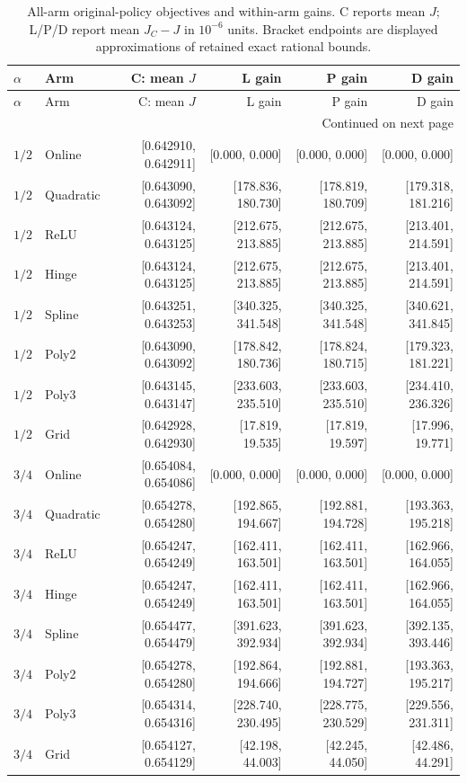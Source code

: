 \begingroup
\scriptsize
\setlength{\tabcolsep}{3pt}
\begin{longtable}{llrrrr}
\caption{All-arm original-policy objectives and within-arm gains. C reports mean $J$; L/P/D report mean $J_C-J$ in $10^{-6}$ units. Bracket endpoints are displayed approximations of retained exact rational bounds.}\label{tab:economic120}\\
\toprule
$\alpha$ & Arm & C: mean $J$ & L gain & P gain & D gain \\ \midrule
\endfirsthead
\toprule
$\alpha$ & Arm & C: mean $J$ & L gain & P gain & D gain \\ \midrule
\endhead
\midrule\multicolumn{6}{r}{Continued on next page}\\\endfoot
\bottomrule\endlastfoot
$1/2$ & Online & [0.642910, 0.642911] & [0.000, 0.000] & [0.000, 0.000] & [0.000, 0.000] \\
$1/2$ & Quadratic & [0.643090, 0.643092] & [178.836, 180.730] & [178.819, 180.709] & [179.318, 181.216] \\
$1/2$ & ReLU & [0.643124, 0.643125] & [212.675, 213.885] & [212.675, 213.885] & [213.401, 214.591] \\
$1/2$ & Hinge & [0.643124, 0.643125] & [212.675, 213.885] & [212.675, 213.885] & [213.401, 214.591] \\
$1/2$ & Spline & [0.643251, 0.643253] & [340.325, 341.548] & [340.325, 341.548] & [340.621, 341.845] \\
$1/2$ & Poly2 & [0.643090, 0.643092] & [178.842, 180.736] & [178.824, 180.715] & [179.323, 181.221] \\
$1/2$ & Poly3 & [0.643145, 0.643147] & [233.603, 235.510] & [233.603, 235.510] & [234.410, 236.326] \\
$1/2$ & Grid & [0.642928, 0.642930] & [17.819, 19.535] & [17.819, 19.597] & [17.996, 19.771] \\
$3/4$ & Online & [0.654084, 0.654086] & [0.000, 0.000] & [0.000, 0.000] & [0.000, 0.000] \\
$3/4$ & Quadratic & [0.654278, 0.654280] & [192.865, 194.667] & [192.881, 194.728] & [193.363, 195.218] \\
$3/4$ & ReLU & [0.654247, 0.654249] & [162.411, 163.501] & [162.411, 163.501] & [162.966, 164.055] \\
$3/4$ & Hinge & [0.654247, 0.654249] & [162.411, 163.501] & [162.411, 163.501] & [162.966, 164.055] \\
$3/4$ & Spline & [0.654477, 0.654479] & [391.623, 392.934] & [391.623, 392.934] & [392.135, 393.446] \\
$3/4$ & Poly2 & [0.654278, 0.654280] & [192.864, 194.666] & [192.881, 194.727] & [193.363, 195.217] \\
$3/4$ & Poly3 & [0.654314, 0.654316] & [228.740, 230.495] & [228.775, 230.529] & [229.556, 231.311] \\
$3/4$ & Grid & [0.654127, 0.654129] & [42.198, 44.003] & [42.245, 44.050] & [42.486, 44.291] \\
\end{longtable}
\endgroup


